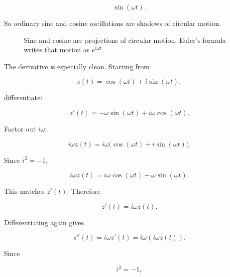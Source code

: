 \[
\sin(\omega t).
\]

So ordinary sine and cosine oscillations are shadows of circular motion.

\begin{figure}[h]
\centering
{}
\caption{Sine and cosine are projections of circular motion.  Euler's formula writes that motion as \(e^{i\omega t}\).}
\label{fig:oscillation-complex-exponential}
\end{figure}

The derivative is especially clean.  Starting from

\[
z(t)=\cos(\omega t)+i\sin(\omega t),
\]

differentiate:

\[
z'(t)
=
-\omega\sin(\omega t)+i\omega\cos(\omega t).
\]

Factor out \(i\omega\):

\[
i\omega z(t)
=
i\omega\bigl(\cos(\omega t)+i\sin(\omega t)\bigr).
\]

Since \(i^2=-1\),

\[
i\omega z(t)
=
i\omega\cos(\omega t)-\omega\sin(\omega t).
\]

This matches \(z'(t)\).  Therefore

\[
\boxed{
z'(t)=i\omega z(t).
}
\]

Differentiating again gives

\[
z''(t)=i\omega z'(t)=i\omega(i\omega z(t)).
\]

Since

\[
i^2=-1,
\]

